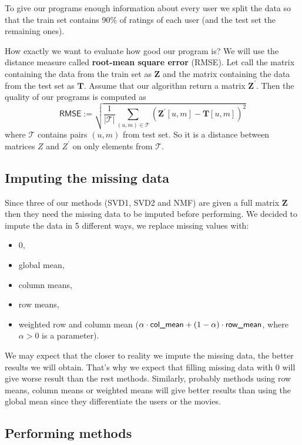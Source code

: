 \documentclass[10pt]{amsart}
\begin{document}
To give our programs enough information about every user we split the data so that the train set contains 90\% of ratings of each user (and the test set the remaining ones).

How exactly we want to evaluate how good our program is?
We will use the distance measure called \textbf{root-mean square error} (RMSE).
Let call the matrix containing the data from the train set as $\boldsymbol{Z}$ and the matrix containing the data from the test set as $\boldsymbol{T}$.
Assume that our algorithm return a matrix $\boldsymbol{Z}^{'}$.
Then the quality of our programs is computed as
\[\textsf{RMSE} :=
\sqrt{\frac{1}{|\mathcal{T}|} \sum_{(u,m) \in \mathcal{T}} \left(\boldsymbol{Z}^{'}[u,m] - \boldsymbol{T}[u,m] \right)^2}\]
where $\mathcal{T}$ contains pairs $(u,m)$ from test set.
So it is a distance between matrices $Z$ and $Z^{'}$ on only elements from $\mathcal{T}$.

\subsection*{Imputing the missing data}

Since three of our methods (SVD1, SVD2 and NMF) are given a full matrix $\boldsymbol{Z}$ then they need the missing data to be imputed before performing.
We decided to impute the data in 5 different ways, we replace missing values with:
\begin{itemize}
    \item 0,
    \item global mean,
    \item column means,
    \item row means,
    \item weighted row and column mean ($\alpha \cdot \text{\textsf{col\_mean}} + (1-\alpha) \cdot \text{\textsf{row\_mean}}$, where $\alpha>0$ is a parameter).
\end{itemize}
We may expect that the closer to reality we impute the missing data, the better results we will obtain.
That's why we expect that filling missing data with 0 will give worse result than the rest methods.
Similarly, probably methods using row means, column means or weighted means will give better results than using the global mean since they differentiate the users or the movies.

\subsection*{Performing methods}
\end{document}
